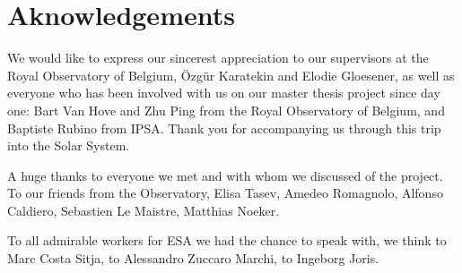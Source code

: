 \section*{Aknowledgements}
\label{aknowlegdements}

We would like to express our sincerest appreciation to our supervisors at the Royal Observatory of Belgium, Özgür Karatekin and Elodie Gloesener, as well as everyone who has been involved with us on our master thesis project since day one: Bart Van Hove and Zhu Ping from the Royal Observatory of Belgium, and Baptiste Rubino from IPSA. Thank you for accompanying us through this trip into the Solar System.

A huge thanks to everyone we met and with whom we discussed of the project. To our friends from the Observatory, Elisa Tasev, Amedeo Romagnolo, Alfonso Caldiero, Sebastien Le Maistre, Matthias Noeker.

To all admirable workers for ESA we had the chance to speak with, we think to Marc Costa Sitja, to Alessandro Zuccaro Marchi, to Ingeborg Joris.
